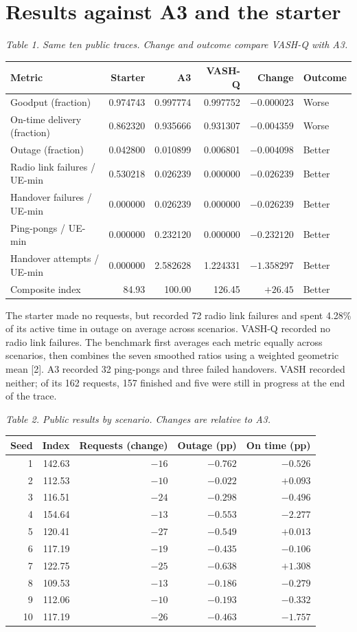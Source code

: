 \documentclass[11pt,a4paper]{article}
\newcommand{\capline}[1]{\par\smallskip\textit{#1}\par}
\begin{document}
\section{Results against A3 and the starter}
\capline{Table 1. Same ten public traces. Change and outcome compare VASH-Q with A3.}
\begin{center}\small\begin{tabular}{lrrrrl}\toprule
Metric & Starter & A3 & VASH-Q & Change & Outcome\\\midrule
Goodput (fraction)&0.974743&0.997774&0.997752&$-0.000023$&Worse\\
On-time delivery (fraction)&0.862320&0.935666&0.931307&$-0.004359$&Worse\\
Outage (fraction)&0.042800&0.010899&0.006801&$-0.004098$&Better\\
Radio link failures / UE-min&0.530218&0.026239&0.000000&$-0.026239$&Better\\
Handover failures / UE-min&0.000000&0.026239&0.000000&$-0.026239$&Better\\
Ping-pongs / UE-min&0.000000&0.232120&0.000000&$-0.232120$&Better\\
Handover attempts / UE-min&0.000000&2.582628&1.224331&$-1.358297$&Better\\
\midrule Composite index&84.93&100.00&126.45&$+26.45$&Better\\\bottomrule
\end{tabular}\end{center}
The starter made no requests, but recorded 72 radio link failures and spent 4.28\% of its active time in outage on average across scenarios. VASH-Q recorded no radio link failures. The benchmark first averages each metric equally across scenarios, then combines the seven smoothed ratios using a weighted geometric mean [2]. A3 recorded 32 ping-pongs and three failed handovers. VASH recorded neither; of its 162 requests, 157 finished and five were still in progress at the end of the trace.
\capline{Table 2. Public results by scenario. Changes are relative to A3.}
\begin{center}\small\begin{tabular}{rrrrr}\toprule
Seed & Index & Requests (change) & Outage (pp) & On time (pp) \\\midrule
1 & 142.63 & $-16$ & $-0.762$ & $-0.526$ \\
2 & 112.53 & $-10$ & $-0.022$ & $+0.093$ \\
3 & 116.51 & $-24$ & $-0.298$ & $-0.496$ \\
4 & 154.64 & $-13$ & $-0.553$ & $-2.277$ \\
5 & 120.41 & $-27$ & $-0.549$ & $+0.013$ \\
6 & 117.19 & $-19$ & $-0.435$ & $-0.106$ \\
7 & 122.75 & $-25$ & $-0.638$ & $+1.308$ \\
8 & 109.53 & $-13$ & $-0.186$ & $-0.279$ \\
9 & 112.06 & $-10$ & $-0.193$ & $-0.332$ \\
10 & 117.19 & $-26$ & $-0.463$ & $-1.757$ \\
\bottomrule\end{tabular}\end{center}
\end{document}
